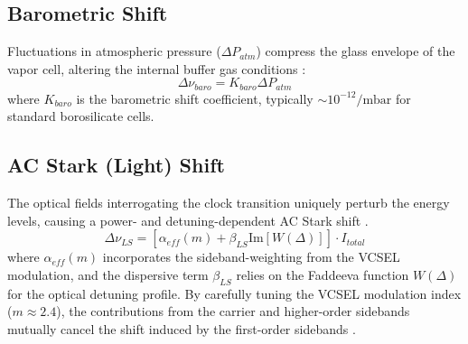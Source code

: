 \documentclass[11pt,a4paper]{article}
\begin{document}
\subsection{Barometric Shift}
Fluctuations in atmospheric pressure ($\Delta P_{atm}$) compress the glass envelope of the vapor cell, altering the internal buffer gas conditions \cite{Moreno2018}:
\begin{equation}
\Delta\nu_{baro} = K_{baro} \Delta P_{atm}
\end{equation}
where $K_{baro}$ is the barometric shift coefficient, typically $\sim 10^{-12} / \text{mbar}$ for standard borosilicate cells.

\subsection{AC Stark (Light) Shift}
The optical fields interrogating the clock transition uniquely perturb the energy levels, causing a power- and detuning-dependent AC Stark shift \cite{Shah2010, Levi2000}.
\begin{equation}
\Delta\nu_{LS} = \left[ \alpha_{eff}(m) + \beta_{LS} \text{Im}[W(\Delta)] \right] \cdot I_{total}
\end{equation}
where $\alpha_{eff}(m)$ incorporates the sideband-weighting from the VCSEL modulation, and the dispersive term $\beta_{LS}$ relies on the Faddeeva function $W(\Delta)$ for the optical detuning profile. By carefully tuning the VCSEL modulation index ($m \approx 2.4$), the contributions from the carrier and higher-order sidebands mutually cancel the shift induced by the first-order sidebands \cite{Shah2006}.
\end{document}
